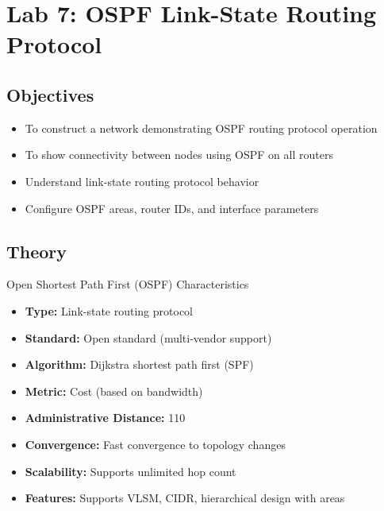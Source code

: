 \documentclass[12pt,a4paper]{article}
\begin{document}
\newpage

\section{Lab 7: OSPF Link-State Routing Protocol}

\subsection{Objectives}
\begin{itemize}[noitemsep]
    \item To construct a network demonstrating OSPF routing protocol operation
    \item To show connectivity between nodes using OSPF on all routers
    \item Understand link-state routing protocol behavior
    \item Configure OSPF areas, router IDs, and interface parameters
\end{itemize}

\subsection{Theory}

\begin{theorybox}{Open Shortest Path First (OSPF) Characteristics}
\begin{itemize}[noitemsep]
    \item \textbf{Type:} Link-state routing protocol
    \item \textbf{Standard:} Open standard (multi-vendor support)
    \item \textbf{Algorithm:} Dijkstra shortest path first (SPF)
    \item \textbf{Metric:} Cost (based on bandwidth)
    \item \textbf{Administrative Distance:} 110
    \item \textbf{Convergence:} Fast convergence to topology changes
    \item \textbf{Scalability:} Supports unlimited hop count
    \item \textbf{Features:} Supports VLSM, CIDR, hierarchical design with areas
\end{itemize}
\end{theorybox}
\end{document}
